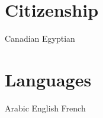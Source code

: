 \section{Citizenship}
Canadian \textbullet{} Egyptian
\sectionsep
\section{Languages}
Arabic \textbullet{} English \textbullet{} French